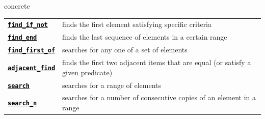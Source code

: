 \documentclass{beamer}
\newcommand\hcode[1]{\textcolor{black}{\texttt{\textbf{#1}}}}
\newcommand{\cppss}[1]{
  \ifstrequal{#1}{11}{\textcolor{blue}{\bf{\tiny{C++#1}}}}
    {\ifstrequal{#1}{14}{\textcolor{DarkGreen}{\bf{\tiny{C++#1}}}}
      {\ifstrequal{#1}{17}{\textcolor{DarkGreen}{\bf{\tiny{C++#1}}}}
        {\ifstrequal{#1}{20}{\textcolor{DarkRed}{\bf{\tiny{C++#1}}}}
          {\textcolor{DarkRed}{\bf{\tiny{#1}}}}}}}}
\begin{document}
\begin{textblock}{28.6}
\begin{beamercolorbox}[sep=5mm,wd=29.1cm,rounded=true]{concrete}
\begin{tabular*}{\linewidth}{l  l}
      \href{http://en.cppreference.com/w/cpp/algorithm/find}{\hcode{find\_if\_not}} \cppss{11} & finds the first element satisfying specific criteria \\
      \rowcolor{white}
      \href{http://en.cppreference.com/w/cpp/algorithm/find_end}{\hcode{find\_end}} & finds the last sequence of elements in a certain range \\
      \href{http://en.cppreference.com/w/cpp/algorithm/find_first_of}{\hcode{find\_first\_of}} & searches for any one of a set of elements \\
      \rowcolor{white}
      \href{http://en.cppreference.com/w/cpp/algorithm/adjacent_find}{\hcode{adjacent\_find}} & finds the first two adjacent items that are equal (or satisfy a given predicate) \\
      \href{http://en.cppreference.com/w/cpp/algorithm/search}{\hcode{search}} & searches for a range of elements \\
      \rowcolor{white}
      \href{http://en.cppreference.com/w/cpp/algorithm/search_n}{\hcode{search\_n}} & searches for a number of consecutive copies of an element in a range \\
    \end{tabular*}

    \vspace*{3.5mm}
    

\end{beamercolorbox}
\end{textblock}
\end{document}
